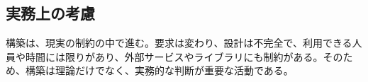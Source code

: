\subsection{実務上の考慮}

構築は、現実の制約の中で進む。要求は変わり、設計は不完全で、利用できる人員や時間には限りがあり、外部サービスやライブラリにも制約がある。そのため、構築は理論だけでなく、実務的な判断が重要な活動である。
